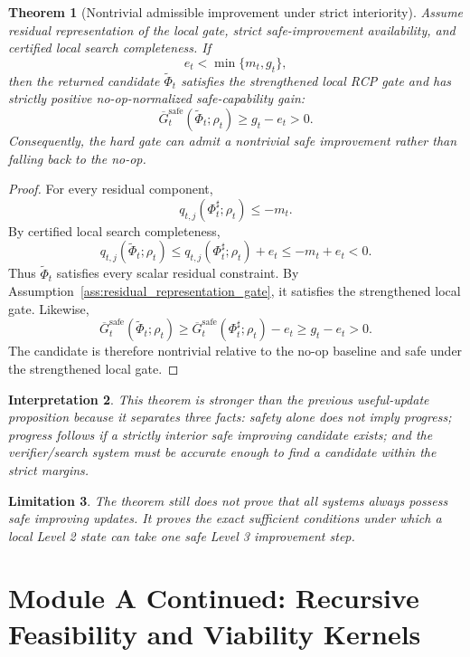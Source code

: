 \documentclass[11pt]{article}
\newtheorem{theorem}{Theorem}[section]
\newtheorem{interpretation}[theorem]{Interpretation}
\newtheorem{limitation}[theorem]{Limitation}
\newcommand{\1}{\mathbf{1}}
\newcommand{\safe}{\mathrm{safe}}
\begin{document}
\begin{theorem}[Nontrivial admissible improvement under strict interiority]
\label{thm:nontrivial_admissible_improvement}
Assume residual representation of the local gate, strict safe-improvement availability, and certified local search completeness.  If
\[
e_t<\min\{m_t,g_t\},
\]
then the returned candidate \(\widetilde\Phi_t\) satisfies the strengthened local RCP gate and has strictly positive no-op-normalized safe-capability gain:
\[
\overline G_t^{\safe}(\widetilde\Phi_t;\rho_t)
\ge g_t-e_t>0.
\]
Consequently, the hard gate can admit a nontrivial safe improvement rather than falling back to the no-op.
\end{theorem}

\begin{proof}
For every residual component,
\[
q_{t,j}(\Phi_t^\sharp;\rho_t)
\le -m_t.
\]
By certified local search completeness,
\[
q_{t,j}(\widetilde\Phi_t;\rho_t)
\le q_{t,j}(\Phi_t^\sharp;\rho_t)+e_t
\le -m_t+e_t<0.
\]
Thus \(\widetilde\Phi_t\) satisfies every scalar residual constraint.  By Assumption~\ref{ass:residual_representation_gate}, it satisfies the strengthened local gate.  Likewise,
\[
\overline G_t^{\safe}(\widetilde\Phi_t;\rho_t)
\ge
\overline G_t^{\safe}(\Phi_t^\sharp;\rho_t)-e_t
\ge
 g_t-e_t>0.
\]
The candidate is therefore nontrivial relative to the no-op baseline and safe under the strengthened local gate.
\end{proof}

\begin{interpretation}
This theorem is stronger than the previous useful-update proposition because it separates three facts: safety alone does not imply progress; progress follows if a strictly interior safe improving candidate exists; and the verifier/search system must be accurate enough to find a candidate within the strict margins.
\end{interpretation}

\begin{limitation}
The theorem still does not prove that all systems always possess safe improving updates.  It proves the exact sufficient conditions under which a local Level 2 state can take one safe Level 3 improvement step.
\end{limitation}

\section{Module A Continued: Recursive Feasibility and Viability Kernels}
\label{sec:recursive_feasibility}
\end{document}
